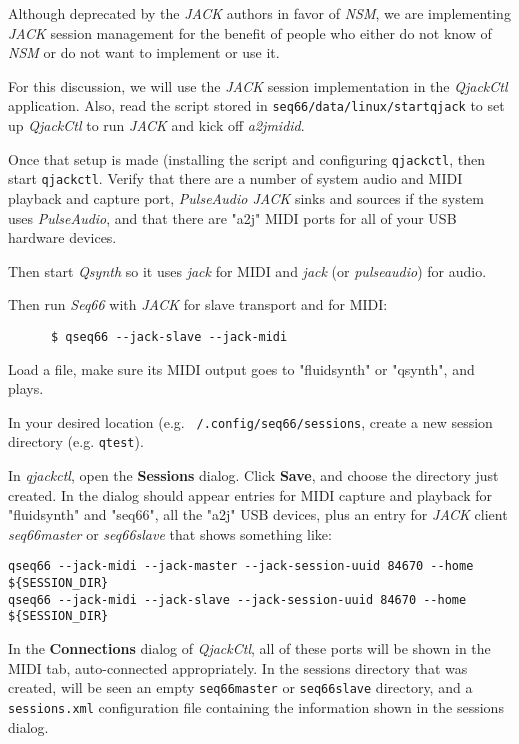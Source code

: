    Although deprecated by the \textsl{JACK} authors in favor of \textsl{NSM},
   we are implementing \textsl{JACK} session management for the benefit of
   people who either do not know of \textsl{NSM} or do not want to implement or
   use it.

   For this discussion, we will use the \textsl{JACK} session implementation in
   the \textsl{QjackCtl} application.
   Also, read the script stored in
   \texttt{seq66/data/linux/startqjack} to set up
   \textsl{QjackCtl} to run \textsl{JACK} and kick off
   \textsl{a2jmidid}.

   Once that setup is made (installing the script and configuring
   \texttt{qjackctl}, then start \texttt{qjackctl}.
   Verify that there are a number of system audio and MIDI playback and capture
   port, \textsl{PulseAudio JACK} sinks and sources if the system uses
   \textsl{PulseAudio}, and that there are "a2j" MIDI ports for all of your USB
   hardware devices.

   Then start \textsl{Qsynth} so it uses \textsl{jack} for MIDI and
   \textsl{jack} (or \textsl{pulseaudio}) for audio.

   Then run \textsl{Seq66} with \textsl{JACK} for slave transport and for MIDI:

   \begin{verbatim}
      $ qseq66 --jack-slave --jack-midi
   \end{verbatim}

   Load a file, make sure its MIDI output goes to "fluidsynth" or "qsynth", and
   plays.

   In your desired location (e.g. \texttt{~/.config/seq66/sessions},
   create a new session directory (e.g. \texttt{qtest}).

   In \textsl{qjackctl}, open the \textbf{Sessions} dialog.
   Click \textbf{Save}, and choose the directory just created.
   In the dialog should appear entries for MIDI capture and playback for
   "fluidsynth" and "seq66", all the "a2j" USB devices,
   plus an entry for \textsl{JACK} client
   \textsl{seq66master} or \textsl{seq66slave} that shows
   something like:

   \begin{verbatim}
qseq66 --jack-midi --jack-master --jack-session-uuid 84670 --home ${SESSION_DIR}
qseq66 --jack-midi --jack-slave --jack-session-uuid 84670 --home ${SESSION_DIR}
   \end{verbatim}

   In the \textbf{Connections} dialog of \textsl{QjackCtl}, all of these ports
   will be shown in the MIDI tab, auto-connected appropriately.
   In the sessions directory that was created, will be seen an
   empty \texttt{seq66master}
   or \texttt{seq66slave} directory, and a
   \texttt{sessions.xml} configuration file containing the information shown in
   the sessions dialog.

